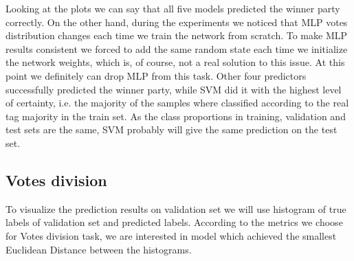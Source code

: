 \documentclass[12pt]{article}
\begin{document}
Looking at the plots we can say that all five models predicted the winner party correctly. On the other hand, during the experiments we noticed that MLP votes distribution changes each time we train the network from scratch. To make MLP results consistent we forced to add the same random state each time we initialize the network weights, which is, of course, not a real solution to this issue. At this point we definitely can drop MLP from this task. Other four predictors successfully predicted the winner party, while SVM did it with the highest level of certainty, i.e. the majority of the samples where classified according to the real tag majority in the train set. As the class proportions in training, validation and test sets are the same, SVM probably will give the same prediction on the test set.
  
\subsection{Votes division}
To visualize the prediction results on validation set we will use histogram of true labels of validation set and predicted labels. According to the metrics we choose for Votes division task, we are interested in model which achieved the smallest Euclidean Distance between the histograms. 
\end{document}
